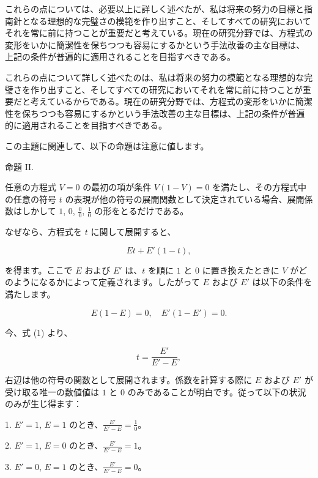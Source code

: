 \documentclass[a4paper,11pt,openany]{ltjsbook}
\begin{document}
これらの点については、必要以上に詳しく述べたが、私は将来の努力の目標と指南針となる理想的な完璧さの模範を作り出すこと、そしてすべての研究においてそれを常に前に持つことが重要だと考えている。現在の研究分野では、方程式の変形をいかに簡潔性を保ちつつも容易にするかという手法改善の主な目標は、上記の条件が普遍的に適用されることを目指すべきである。

これらの点について詳しく述べたのは、私は将来の努力の模範となる理想的な完璧さを作り出すこと、そしてすべての研究においてそれを常に前に持つことが重要だと考えているからである。現在の研究分野では、方程式の変形をいかに簡潔性を保ちつつも容易にするかという手法改善の主な目標は、上記の条件が普遍的に適用されることを目指すべきである。

この主題に関連して、以下の命題は注意に値します。

\begin{center}
\textsc{命題 II.}
\end{center}

任意の方程式 $V = 0$ の最初の項が条件 $V(1-V) = 0$ を満たし、その方程式中の任意の符号 $t$ の表現が他の符号の展開関数として決定されている場合、展開係数はしかして $1$, $0$, $\displaystyle\frac{0}{0}$, $\displaystyle\frac{1}{0}$ の形をとるだけである。

なぜなら、方程式を $t$ に関して展開すると、

\begin{equation}
Et + E'(1 - t),
\end{equation}

を得ます。ここで $E$ および $E'$ は、$t$ を順に $1$ と $0$ に置き換えたときに $V$ がどのようになるかによって定義されます。したがって $E$ および $E'$ は以下の条件を満たします。

\begin{equation}
E(1 - E) = 0,\quad E'(1 - E') = 0.
\end{equation}

今、式 (1) より、

\[
t = \frac{E'}{E' - E},
\]

右辺は他の符号の関数として展開されます。係数を計算する際に $E$ および $E'$ が受け取る唯一の数値値は $1$ と $0$ のみであることが明白です。従って以下の状況のみが生じ得ます：

1. $E' = 1$, $E = 1$ のとき、$\displaystyle\frac{E'}{E'-E} = \frac{1}{0}$。

2. $E' = 1$, $E = 0$ のとき、$\displaystyle\frac{E'}{E'-E} = 1$。

3. $E' = 0$, $E = 1$ のとき、$\displaystyle\frac{E'}{E'-E} = 0$。
\end{document}

